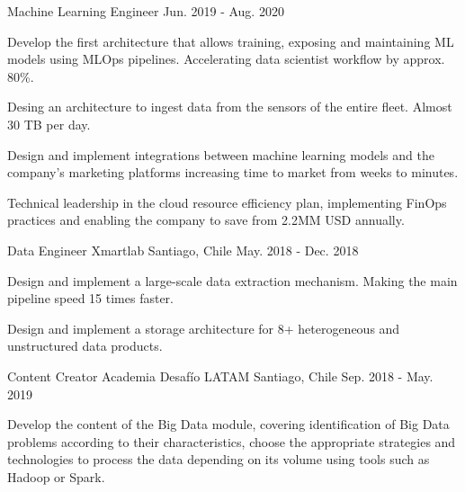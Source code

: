 \begin{cventries}
  \cventry
    {Machine Learning Engineer} %
    {} %
    {} %
    {Jun. 2019 - Aug. 2020} %
    {
    \begin{cvitems} %
      \item {Develop the first architecture that allows training, exposing and maintaining ML models using MLOps pipelines. Accelerating data scientist workflow by approx. 80\%.}
      \item {Desing an architecture to ingest data from the sensors of the entire fleet. Almost 30 TB per day.}
      \item {Design and implement integrations between machine learning models and the company's marketing platforms increasing time to market from weeks to minutes.}
      \item {Technical leadership in the cloud resource efficiency plan, implementing FinOps practices and enabling the company to save from 2.2MM USD annually.}
    \end{cvitems}
    }

  \cventry
    {Data Engineer} %
    {Xmartlab} %
    {Santiago, Chile} %
    {May. 2018 - Dec. 2018} %
    {
      \begin{cvitems} %
        \item {Design and implement a large-scale data extraction mechanism. Making the main pipeline speed 15 times faster.}
        \item {Design and implement a storage architecture for 8+ heterogeneous and unstructured data products.}
      \end{cvitems}
    }

\cventry
  {Content Creator} %
  {Academia Desafío LATAM} %
  {Santiago, Chile} %
  {Sep. 2018 - May. 2019} %
  {
    \begin{cvitems} %
      \item {Develop the content of the Big Data module, covering identification of Big Data problems according to their characteristics, choose the appropriate strategies and technologies to process the data depending on its volume using tools such as Hadoop or Spark.}
    \end{cvitems}
  }


\end{cventries}
